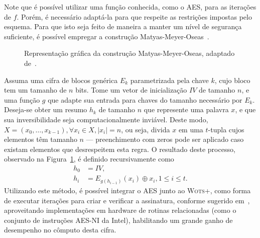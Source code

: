 \documentclass[12pt]{report}
\newcommand{\length}[1]{\vert #1 \vert}
\begin{document}
Note que é possível utilizar uma função conhecida, como o AES, para as
iterações de $f$. Porém, é necessário adaptá-la para que respeite as
restrições impostas pelo esquema. Para que isto seja feito de maneira
a manter um nível de segurança suficiente, é possível empregar a construção
Matyas-Meyer-Oseas~\cite[9.41]{Menezes:1996:HAC:548089}.

\begin{figure}[ht]
  \centering
  \caption{Representação gráfica da construção Matyas-Meyer-Oseas,
    adaptado de~\cite{TikZ:for:Cryptographers}.}
  \label{fig:6}
\end{figure}

Assuma uma cifra de blocos genérica $E_{k}$ parametrizada pela chave $k$, cujo
bloco tem um tamanho de $n$ bits. Tome um vetor de inicialização $IV$ de
tamanho $n$, e uma função $g$ que adapte sua entrada para chaves do tamanho
necessário por $E_{k}$. Deseja-se obter um resumo $h_k$ de tamanho $n$ que
represente uma palavra $x$, e que sua inversibilidade seja computacionalmente
inviável. Deste modo, $X = (x_0, \dots, x_{k - 1}), \forall x_i \in X,
\length{x_i} = n$, ou seja, divida $x$ em uma $t$-tupla cujos elementos têm
tamanho $n$ --- preenchimento com zeros pode ser aplicado caso existam
elementos que desrespeitem esta regra. O resultado deste processo, observado
na Figura~\ref{fig:6}, é definido recursivamente como
\begin{equation}
    \begin{split}
        h_0 &= IV, \\
        h_i &= E_{g(h_{i-1})}(x_i) \oplus x_i, 1 \leq i \leq t.
    \end{split}
\end{equation}
Utilizando este método, é possível integrar o AES junto ao \textsc{Wots+}, como
forma de executar iterações para criar e verificar a assinatura, conforme
sugerido em~\cite[4.1]{Hlsing2013}, aproveitando implementações em
hardware de rotinas relacionadas (como o conjunto de instruções AES-NI da
Intel), habilitando um grande ganho de desempenho no cômputo desta cifra.
\end{document}
